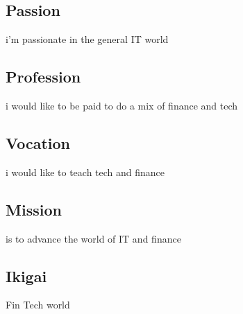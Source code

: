 \documentclass[12pt,titlepage]{article}
\begin{document}
\subsection*{Passion}
i'm passionate in the general IT world
\subsection*{Profession}
i would like to be paid to do a mix of finance and tech
\subsection*{Vocation}
i would like to teach tech and finance
\subsection*{Mission}
is to advance the world of IT and finance
\subsection*{Ikigai}
Fin Tech world
\end{document}
